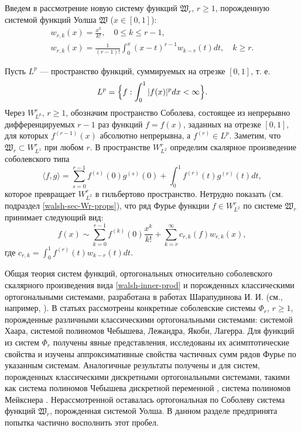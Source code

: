 Введем в рассмотрение новую систему функций $\mathfrak{W}_r$, $r \ge 1$, порожденную системой функций Уолша $\mathfrak{W}$ ($x \in [0,1]$):
\begin{gather}
\label{walsh-wrk-1}
w_{r,k}(x) = \frac{x^k}{k!}, \quad 0 \le k \le r-1,\\
\label{walsh-wrk-2}
w_{r,k}(x) = \frac{1}{(r-1)!}\int_{0}^{x}(x-t)^{r-1}w_{k-r}(t)dt, \quad k \ge r.
\end{gather}



Пусть $L^p$ --- пространство функций, суммируемых на отрезке $[0,1]$, т. е.
\begin{equation}
L^p=\Bigl\{
f: \int_{0}^{1}|f(x)|^pdx < \infty
\Bigr\}.
\end{equation}
Через $W_{L^p}^r$, $r \ge 1$, обозначим пространство Соболева, состоящее из непрерывно дифференцируемых $r-1$ раз функций $f=f(x)$, заданных на отрезке $[0,1]$, для которых $f^{(r-1)}(x)$ абсолютно непрерывна, а $f^{(r)}\in L^p$. Заметим, что $\mathfrak{W}_r \subset W_{L^1}^r$ при любом $r$. В пространстве $W_{L^2}^r$ определим скалярное произведение соболевского типа
\begin{equation}\label{walsh-inner-prod}
\langle f,g \rangle=\sum_{s=0}^{r-1}f^{(s)}(0)g^{(s)}(0)+\int_0^1 f^{(r)}(t)g^{(r)}(t)dt,
\end{equation}
которое превращает $W_{L^2}^r$ в гильбертово пространство.
Нетрудно показать (см. подраздел \ref{walsh-sec-Wr-props}), что ряд Фурье функции $f \in W_{L^2}^r$ по системе $\mathfrak{W}_r$ принимает следующий вид:
\begin{equation}\label{walsh-fourier-series-intro}
f(x) \sim \sum_{k=0}^{r-1}f^{(k)}(0)\frac{x^k}{k!}+
\sum_{k=r}^{\infty}c_{r,k}(f)w_{r,k}(x),
\end{equation}
где $c_{r,k}=\int_{0}^{1}f^{(r)}(t)w_{k-r}(t)dt$.

Общая теория систем функций, ортогональных относительно соболевского скалярного произведения вида \eqref{walsh-inner-prod} и порожденных классическими ортогональными системами, разработана в работах Шарапудинова И. И. (см., например, \cite{SharIzv2018}). В статьях \cite{SharIzv2018, Shar2017, SharSMJ2017, walsh-ShII-2015-demi} рассмотрены конкретные соболевские системы $\Phi_r$, $r \ge 1$, порожденные различными классическими ортогональными системами: системой Хаара, системой полиномов Чебышева, Лежандра, Якоби, Лагерра. Для функций из систем $\Phi_r$ получены явные представления, исследованы их асимптотические свойства и изучены аппроксимативные свойства частичных сумм рядов Фурье по указанным системам. 
Аналогичные результаты получены и для систем, порожденных классическими дискретными ортогональными системами, такими как система полиномов Чебышева дискретной переменной \cite{SharIZVUZ}, система полиномов Мейкснера \cite{walsh-ShII-meix-2016, walsh-Gadzh-2016-saratov}. Нерассмотренной оставалась ортогональная по Соболеву система функций $\mathfrak{W}_r$, порожденная системой Уолша. В данном разделе предпринята попытка частично восполнить этот пробел.

